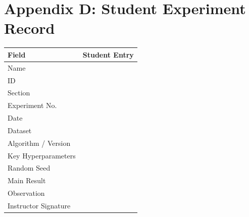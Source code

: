 \chapter{Appendix D: Student Experiment
Record}\label{appendix-d-student-experiment-record}

{\def\LTcaptype{none} %
\begin{longtable}[]{@{}ll@{}}
\toprule\noalign{}
Field & Student Entry \\
\midrule\noalign{}
\endhead
\bottomrule\noalign{}
\endlastfoot
Name & \\
ID & \\
Section & \\
Experiment No. & \\
Date & \\
Dataset & \\
Algorithm / Version & \\
Key Hyperparameters & \\
Random Seed & \\
Main Result & \\
Observation & \\
Instructor Signature & \\
\end{longtable}
}

